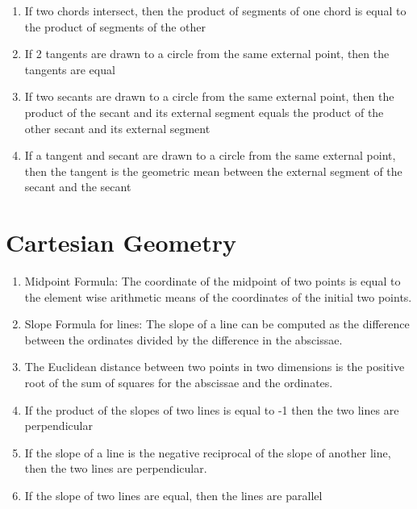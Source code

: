 \begin{enumerate}
    \item If two chords intersect, then the product of segments of one chord is equal to the product of segments of the other
    \item If 2 tangents are drawn to a circle from the same external point, then the tangents are equal
    \item If two secants are drawn to a circle from the same external point, then the product of the secant and its external segment equals the product of the other secant and its external segment
    \item If a tangent and secant are drawn to a circle from the same external point, then the tangent is the geometric mean between the external segment of the secant and the secant
\end{enumerate}

\section*{Cartesian Geometry}
\begin{enumerate}
    \item Midpoint Formula: The coordinate of the midpoint of two points is equal to the element wise arithmetic means of the coordinates of the initial two points.
    \item Slope Formula for lines: The slope of a line can be computed as the difference between the ordinates divided by the difference in the abscissae.
    \item The Euclidean distance between two points in two dimensions is the positive root of the sum of squares for the abscissae and the ordinates.
    \item If the product of the slopes of two lines is equal to -1 then the two lines are perpendicular
    \item If the slope of a line is the negative reciprocal of the slope of another line, then the two lines are perpendicular.
    \item If the slope of two lines are equal, then the lines are parallel
\end{enumerate}
